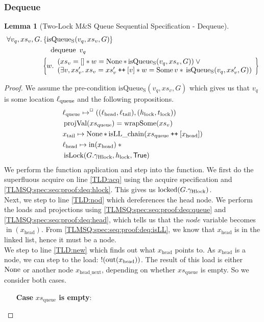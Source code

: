 \documentclass[a4paper, 10pt]{report}
\theoremstyle{definition}
\newtheorem{lemma}[theorem]{Lemma}
\newcommand{\isLock}{\operatorname{isLock}}
\newcommand{\locked}{\operatorname{locked}}
\newcommand{\dequeue}{\operatorname{dequeue}}
\newcommand{\msq}{M\&S Queue}
\newcommand{\tlmsq}{Two-Lock \msq{}}
\newcommand{\isqueueseq}{\operatorname{isQueue_{S}}}
\newcommand{\vq}{v_q}
\newcommand{\xsqueue}{xs_{\mathrm{queue}}}
\newcommand{\isLLchain}{\operatorname{isLL\_chain}}
\newcommand{\projval}{\operatorname{projVal}}
\newcommand{\wrapsome}{\operatorname{wrapSome}}
\newcommand{\locN}[1]{\loc_{\mathrm{#1}}}
\newcommand{\lochead}{\locN{head}}
\newcommand{\loctail}{\locN{tail}}
\newcommand{\locqueue}{\locN{queue}}
\newcommand{\nodeval}{\valB}
\newcommand{\nIn}[1]{\operatorname{in}(#1)}
\newcommand{\nOut}[1]{\operatorname{out}(#1)}
\newcommand{\node}{x}
\newcommand{\nodeN}[1]{\node_{\mathrm{#1}}}
\newcommand{\nodehead}{\nodeN{head}}
\newcommand{\nodetail}{\nodeN{tail}}
\newcommand{\nodeheadnext}{\nodeN{head\_next}}
\newcommand{\absvalue}{\val}
\newcommand{\absvalueList}{xs_v}
\newcommand{\Hlock}{h_{\mathrm{lock}}}
\newcommand{\Tlock}{t_{\mathrm{lock}}}
\newcommand{\Qg}{G}
\newcommand{\ghlock}{\gname_{\mathrm{Hlock}}}
\newcommand\catenate{\mathbin{\text{\ttfamily\upshape ++}}}
\newcommand{\seqspecdeqHT}[3]{\hoareV[t]{\isqueueseq(#1, #2, #3)}{\dequeue \ #1}{\nodeval . \begin{array}{l}(#2 = [] \star{} \nodeval = \None \star{} \isqueueseq(#1, #2, #3)) \lor{}\\ (\Exists \absvalue, #2' . #2 = #2' \catenate [\absvalue] \star{} \nodeval = \Some \absvalue \star{} \isqueueseq(#1, #2', #3)) \end{array}}}
\newcommand{\seqspecdeqGen}[3]{\All #1, #2, #3. \seqspecdeqHT{#1}{#2}{#3}}
\newcommand{\seqspecdeq}{\seqspecdeqGen{\vq}{\absvalueList}{\Qg}}
\begin{document}
\subsubsection{Dequeue}
\begin{lemma}[\tlmsq{} Sequential Specification - Dequeue]\label{TLMSQ:spec:seq:dequeue}
  \begin{equation*}
    \seqspecdeq
  \end{equation*}
\end{lemma}
\begin{proof}
We assume the pre-condition $\isqueueseq(\vq, \absvalueList, \Qg)$ which gives us that $\vq$ is some location $\locqueue$ and the following propositions.
\begin{align}
  &\locqueue \mapsto^{\persistently} ((\lochead, \loctail), (\Hlock, \Tlock))\label{TLMSQ:spec:seq:proof:deq:queue}\\
  &\projval(\xsqueue) = \wrapsome(\absvalueList)\label{TLMSQ:spec:seq:proof:deq:rel}\\
  &\nodetail \mapsto \None \star{} \isLLchain (\xsqueue \catenate [\nodehead])\label{TLMSQ:spec:seq:proof:deq:isLL}\\
  &\lochead \mapsto \nIn{\nodehead} \star{}\label{TLMSQ:spec:seq:proof:deq:head}\\
  &\isLock(\Qg.\ghlock, \Hlock, \TRUE)\label{TLMSQ:spec:seq:proof:deq:hlock}
\end{align}
We perform the function application and step into the function. We first do the superfluous acquire on line \ref{TLD:acq} using the acquire specification and \ref{TLMSQ:spec:seq:proof:deq:hlock}. This gives us $\locked(\Qg.\ghlock)$.\\
Next, we step to line \ref{TLD:nod} which dereferences the head node. We perform the loads and projections using \ref{TLMSQ:spec:seq:proof:deq:queue} and \ref*{TLMSQ:spec:seq:proof:deq:head}, which tells us that the $node$ variable becomes $\nIn{\nodehead}$. From \ref{TLMSQ:spec:seq:proof:deq:isLL}, we know that $\nodehead$ is in the linked list, hence it must be a node.\\
We step to line \ref{TLD:new} which finds out what $\nodehead$ points to. As $\nodehead$ is a node, we can step to the load: $\deref (\nOut{\nodehead})$. The result of this load is either $\operatorname{None}$ or another node $\nodeheadnext$, depending on whether $\xsqueue$ is empty. So we consider both cases.
\begin{itemize}
  \item[\textbf{Case}] \textbf{$\xsqueue$ is empty}:

\end{itemize}
\end{proof}
\end{document}
